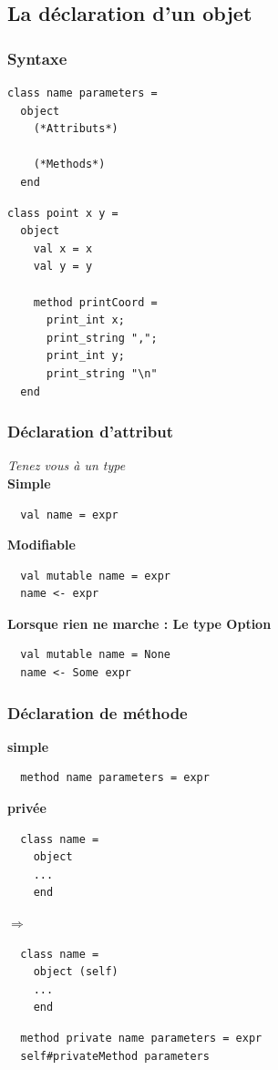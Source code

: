 \subsection{La déclaration d'un objet} %
\begin{frame}[fragile]
	\frametitle{Syntaxe}
	\begin{minipage}{0.45\textwidth}
		\lstset{basicstyle=\small}
		\begin{lstlisting}
class name parameters =
  object
    (*Attributs*)
    
    (*Methods*)
  end
		\end{lstlisting}
	\end{minipage}
	\begin{minipage}{0.4\textwidth}
		\begin{lstlisting}
class point x y =
  object
    val x = x
    val y = y

    method printCoord =
      print_int x;
      print_string ",";
      print_int y;
      print_string "\n"
  end
		\end{lstlisting}
	\end{minipage}
\end{frame}

\begin{frame}[fragile]
	\frametitle{Déclaration d'attribut}
	\textit{Tenez vous à un type}\\
	\textbf{Simple}
	\begin{lstlisting}
  val name = expr
	\end{lstlisting}
	\textbf{Modifiable}
	\begin{lstlisting}
  val mutable name = expr
  name <- expr
	\end{lstlisting}
	\textbf{Lorsque rien ne marche : Le type Option}
	\begin{lstlisting}
  val mutable name = None
  name <- Some expr
	\end{lstlisting}
\end{frame}

\begin{frame}[fragile]
	\frametitle{Déclaration de méthode}
	\textbf{simple}
	\begin{lstlisting}
  method name parameters = expr
	\end{lstlisting}
	\textbf{privée}\\
	\begin{minipage}{0.4\textwidth}
  	\begin{lstlisting}
  class name =
    object
    ...
    end
		\end{lstlisting}
	\end{minipage}$\Rightarrow$
	\begin{minipage}{0.4\textwidth}
		\begin{lstlisting}
  class name =
    object (self)
    ...
    end
		\end{lstlisting}
	\end{minipage}
	\begin{lstlisting}
  method private name parameters = expr
  self#privateMethod parameters
	\end{lstlisting}
\end{frame}

